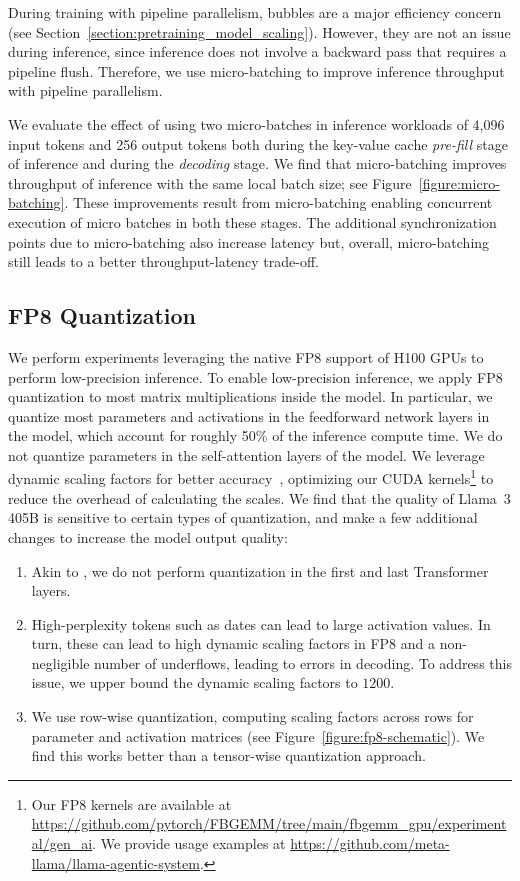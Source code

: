 During training with pipeline parallelism, bubbles are a major efficiency concern (see Section~\ref{section:pretraining_model_scaling}).
However, they are not an issue during inference, since inference does not involve a backward pass that requires a pipeline flush. Therefore, we use micro-batching to improve inference throughput with pipeline parallelism. 

We evaluate the effect of using two micro-batches in inference workloads of 4,096 input tokens and 256 output tokens both during the key-value cache \emph{pre-fill} stage of inference and during the \emph{decoding} stage. We find that micro-batching improves throughput of inference with the same local batch size; see Figure~\ref{figure:micro-batching}.
These improvements result from micro-batching enabling concurrent execution of micro batches in both these stages. The additional synchronization points due to micro-batching also increase latency but, overall, micro-batching still leads to a better throughput-latency trade-off.

\subsection{FP8 Quantization}
\label{section:fp8}
We perform experiments leveraging the native FP8 support of H100 GPUs to perform low-precision inference. To enable low-precision inference, we apply FP8 quantization to most matrix multiplications inside the model. In particular, we quantize most parameters and activations in the feedforward network layers in the model, which account for roughly 50\% of the inference compute time. We do not quantize parameters in the self-attention layers of the model. We leverage dynamic scaling factors for better accuracy~\citep{xiao2024smoothquant}, optimizing our CUDA kernels\footnote{Our FP8 kernels are available at \url{https://github.com/pytorch/FBGEMM/tree/main/fbgemm_gpu/experimental/gen_ai}. We provide usage examples at \url{https://github.com/meta-llama/llama-agentic-system}.} to reduce the overhead of calculating the scales. We find that the quality of Llama~3 405B is sensitive to certain types of quantization, and make a few additional changes to increase the model output quality:

\begin{enumerate}
    \item Akin to \cite{zhang2021training}, we do not perform quantization in the first and last Transformer layers.
    \item High-perplexity tokens such as dates can lead to large activation values. In turn, these can lead to high dynamic scaling factors in FP8 and a non-negligible number of underflows, leading to errors in decoding. To address this issue, we upper bound the dynamic scaling factors to $1200$.
    \item We use row-wise quantization, computing scaling factors across rows for  parameter and activation matrices (see Figure~\ref{figure:fp8-schematic}). We find this works better than a tensor-wise quantization approach. 
\end{enumerate}


